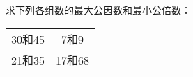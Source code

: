 
求下列各组数的最大公因数和最小公倍数：\\
\begin{tabular}{cc}
30和45\hspace{16em} & 7和9\hspace{16em} \\[8em]
21和35\hspace{16em} & 17和68\hspace{16em} \\[8em]
\end{tabular}

